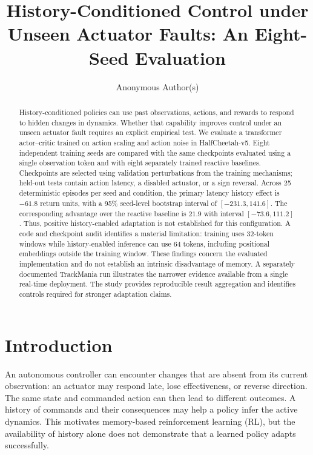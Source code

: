 \documentclass[runningheads]{llncs}
\begin{document}
\title{History-Conditioned Control under Unseen Actuator Faults: An Eight-Seed Evaluation}
\author{Anonymous Author(s)}
\institute{}
\maketitle

\begin{abstract}
History-conditioned policies can use past observations, actions, and rewards to respond to hidden changes in dynamics. Whether that capability improves control under an unseen actuator fault requires an explicit empirical test. We evaluate a transformer actor--critic trained on action scaling and action noise in HalfCheetah-v5. Eight independent training seeds are compared with the same checkpoints evaluated using a single observation token and with eight separately trained reactive baselines. Checkpoints are selected using validation perturbations from the training mechanisms; held-out tests contain action latency, a disabled actuator, or a sign reversal. Across 25 deterministic episodes per seed and condition, the primary latency history effect is $-61.8$ return units, with a 95\% seed-level bootstrap interval of $[-231.3,141.6]$. The corresponding advantage over the reactive baseline is $21.9$ with interval $[-73.6,111.2]$. Thus, positive history-enabled adaptation is not established for this configuration. A code and checkpoint audit identifies a material limitation: training uses 32-token windows while history-enabled inference can use 64 tokens, including positional embeddings outside the training window. These findings concern the evaluated implementation and do not establish an intrinsic disadvantage of memory. A separately documented TrackMania run illustrates the narrower evidence available from a single real-time deployment. The study provides reproducible result aggregation and identifies controls required for stronger adaptation claims.
\end{abstract}

\section{Introduction}
An autonomous controller can encounter changes that are absent from its current observation: an actuator may respond late, lose effectiveness, or reverse direction. The same state and commanded action can then lead to different outcomes. A history of commands and their consequences may help a policy infer the active dynamics. This motivates memory-based reinforcement learning (RL), but the availability of history alone does not demonstrate that a learned policy adapts successfully.
\end{document}
